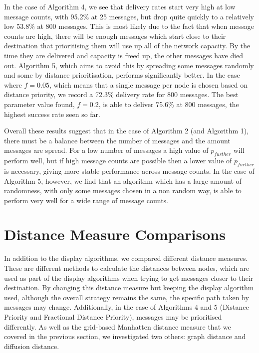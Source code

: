 \documentclass[bsc,frontabs,twoside,singlespacing,parskip,deptreport]{infthesis}     %
\begin{document}
In the case of Algorithm 4, we see that delivery rates start very high at low message counts, with 95.2\% at 25 messages, but drop quite quickly to a relatively low 53.8\% at 800 messages. This is most likely due to the fact that when message counts are high, there will be enough messages which start close to their destination that prioritising them will use up all of the network capacity. By the time they are delivered and capacity is freed up, the other messages have died out. Algorithm 5, which aims to avoid this by spreading some messages randomly and some by distance prioritisation, performs significantly better. In the case where $f=0.05$, which means that a single message per node is chosen based on distance priority, we record a 72.3\% delivery rate for 800 messages. The best parameter value found, $f=0.2$, is able to deliver 75.6\% at 800 messages, the highest success rate seen so far.

Overall these results suggest that in the case of Algorithm 2 (and Algorithm 1), there must be a balance between the number of messages and the amount messages are spread. For a low number of messages a high value of $p_{further}$ will perform well, but if high message counts are possible then a lower value of $p_{further}$ is necessary, giving more stable performance across message counts. In the case of Algorithm 5, however, we find that an algorithm which has a large amount of randomness, with only some messages chosen in a non random way, is able to perform very well for a wide range of message counts.

\section{Distance Measure Comparisons} \label{sec:distance_measure_comparisons}
In addition to the display algorithms, we compared different distance measures. These are different methods to calculate the distances between nodes, which are used as part of the display algorithms when trying to get messages closer to their destination. By changing this distance measure but keeping the display algorithm used, although the overall strategy remains the same, the specific path taken by messages may change. Additionally, in the case of Algorithms 4 and 5 (Distance Priority and Fractional Distance Priority), messages may be prioritised differently. As well as the grid-based Manhatten distance measure that we covered in the previous section, we investigated two others: graph distance and diffusion distance.
\end{document}
